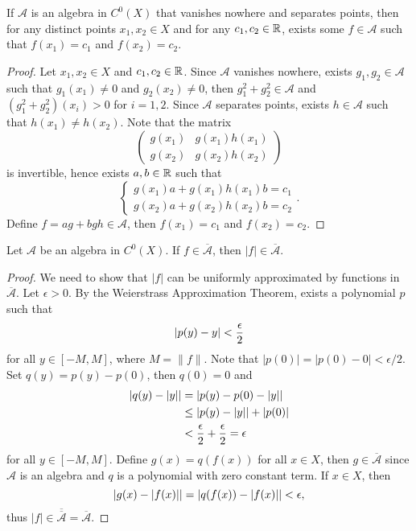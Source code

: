 \begin{lm}
    If $\mathcal A$ is an algebra in $C^0(X)$ that vanishes nowhere and separates points, then for any distinct points $x_1, x_2 \in X$ and for any $c_1, c_2 \in {\mathbb R}$, exists some $f \in \mathcal A$ such that $f(x_1) = c_1$ and $f(x_2) = c_2$.
    \begin{proof}
        Let $x_1, x_2 \in X$ and $c_1, c_2 \in {\mathbb R}$. Since $\mathcal A$ vanishes nowhere, exists $g_1, g_2 \in \mathcal A$ such that $g_1(x_1) \neq 0$ and $g_2(x_2) \neq 0$, then $g_1^2 + g_2^2 \in \mathcal A$ and $(g_1^2 + g_2^2)(x_i) > 0$ for $i = 1, 2$. Since $\mathcal A$ separates points, exists $h \in \mathcal A$ such that $h(x_1) \neq h(x_2)$. Note that the matrix
        \[
        \begin{pmatrix}
            g(x_1) & g(x_1)h(x_1) \\
            g(x_2) & g(x_2)h(x_2)
        \end{pmatrix}
        \]
        is invertible, hence exists $a, b \in {\mathbb R}$ such that
        \[
        \begin{cases}
            g(x_1)a + g(x_1)h(x_1)b = c_1 \\
            g(x_2)a + g(x_2)h(x_2)b = c_2
        \end{cases}.
        \]
        Define $f = ag + bgh \in \mathcal A$, then $f(x_1) = c_1$ and $f(x_2) = c_2$.
    \end{proof}
\end{lm}

\begin{lm}
    Let $\mathcal A$ be an algebra in $C^0(X)$. If $f \in \overline{\mathcal A}$, then $|f| \in \overline{\mathcal A}$.
    \begin{proof}
        We need to show that $|f|$ can be uniformly approximated by functions in $\overline{\mathcal A}$. Let $\epsilon > 0$. By the Weierstrass Approximation Theorem, exists a polynomial $p$ such that
        \[
        {\left| p(y) - y \right|} < \frac{\epsilon}{2}
        \]
        for all $y \in [-M, M]$, where $M = \|f\|$. Note that $|p(0)| = |p(0) - 0| < \epsilon/2$. Set $q(y) = p(y) - p(0)$, then $q(0) = 0$ and
        \begin{align*}
            |q(y) - |y|| &= {\left| p(y) - p(0) - |y| \right|} \\
            &\leq |p(y) - |y|| + |p(0)| \\
            &< \frac{\epsilon}{2} + \frac{\epsilon}{2} = \epsilon
        \end{align*}
        for all $y \in [-M, M]$. Define $g(x) = q(f(x))$ for all $x \in X$, then $g \in \overline{\mathcal A}$ since $\mathcal A$ is an algebra and $q$ is a polynomial with zero constant term. If $x \in X$, then
        \[
        {\left| g(x) - |f(x)| \right|} = {\left| q(f(x)) - |f(x)| \right|} < \epsilon,
        \]
        thus $|f| \in \overline{\overline{\mathcal A}} = \overline{\mathcal A}$.
    \end{proof}
\end{lm}

